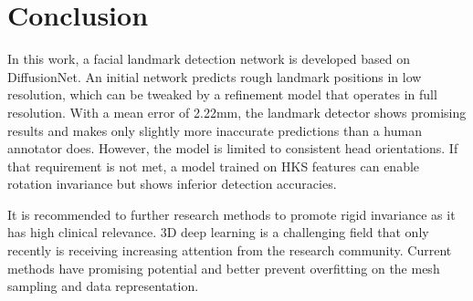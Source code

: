 \documentclass[class=article, crop=false]{standalone}
\begin{document}
\section{Conclusion}
\label{sec:conclusion}


In this work, a facial landmark detection network is developed based on DiffusionNet. An initial network predicts rough landmark positions in low resolution, which can be tweaked by a refinement model that operates in full resolution. With a mean error of 2.22mm, the landmark detector shows promising results and makes only slightly more inaccurate predictions than a human annotator does. However, the model is limited to consistent head orientations. If that requirement is not met, a model trained on HKS features can enable rotation invariance but shows inferior detection accuracies.


It is recommended to further research methods to promote rigid invariance as it has high clinical relevance. 3D deep learning is a challenging field that only recently is receiving increasing attention from the research community. Current methods have promising potential and better prevent overfitting on the mesh sampling and data representation.

\end{document}
